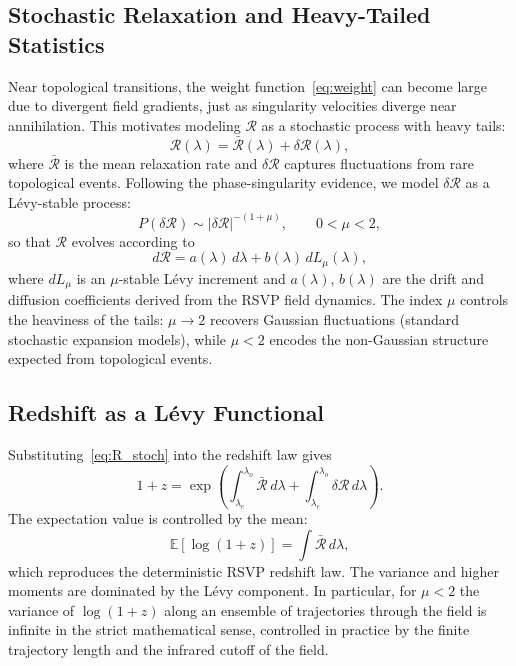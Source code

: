 \documentclass[12pt,a4paper]{article}
\theoremstyle{remark}
\newcommand{\Rcal}{\mathcal{R}}
\begin{document}
\subsection{Stochastic Relaxation and Heavy-Tailed Statistics}

Near topological transitions, the weight function~\eqref{eq:weight} can become
large due to divergent field gradients, just as singularity velocities diverge
near annihilation. This motivates modeling $\Rcal$ as a stochastic process
with heavy tails:
\begin{equation}
\Rcal(\lambda) = \bar{\Rcal}(\lambda) + \delta\Rcal(\lambda),
\label{eq:R_stoch}
\end{equation}
where $\bar{\Rcal}$ is the mean relaxation rate and $\delta\Rcal$ captures
fluctuations from rare topological events. Following the phase-singularity
evidence, we model $\delta\Rcal$ as a L\'{e}vy-stable process:
\begin{equation}
P(\delta\Rcal) \sim |\delta\Rcal|^{-(1+\mu)}, \qquad 0 < \mu < 2,
\label{eq:levy}
\end{equation}
so that $\Rcal$ evolves according to
\begin{equation}
d\Rcal = a(\lambda)\,d\lambda + b(\lambda)\,dL_\mu(\lambda),
\end{equation}
where $dL_\mu$ is an $\mu$-stable L\'{e}vy increment and $a(\lambda)$,
$b(\lambda)$ are the drift and diffusion coefficients derived from the RSVP
field dynamics. The index $\mu$ controls the heaviness of the tails: $\mu \to 2$
recovers Gaussian fluctuations (standard stochastic expansion models), while
$\mu < 2$ encodes the non-Gaussian structure expected from topological events.

\subsection{Redshift as a L\'{e}vy Functional}

Substituting~\eqref{eq:R_stoch} into the redshift law gives
\begin{equation}
1 + z = \exp\!\left(\int_{\lambda_e}^{\lambda_o}\bar{\Rcal}\,d\lambda
                  + \int_{\lambda_e}^{\lambda_o}\delta\Rcal\,d\lambda\right).
\label{eq:z_levy}
\end{equation}
The expectation value is controlled by the mean:
\begin{equation}
\mathbb{E}[\log(1+z)] = \int\bar{\Rcal}\,d\lambda,
\end{equation}
which reproduces the deterministic RSVP redshift law. The variance and higher
moments are dominated by the L\'{e}vy component. In particular, for $\mu < 2$
the variance of $\log(1+z)$ along an ensemble of trajectories through the
field is infinite in the strict mathematical sense, controlled in practice by
the finite trajectory length and the infrared cutoff of the field.
\end{document}
